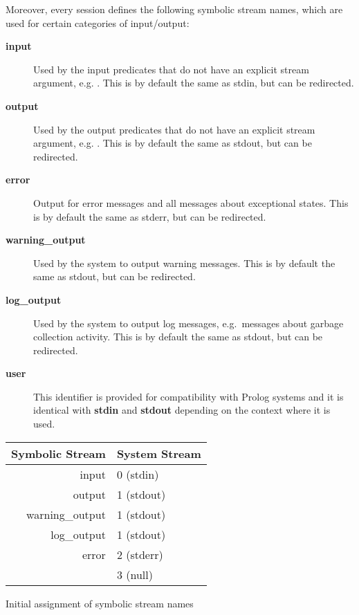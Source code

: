 Moreover, every {\eclipse} session defines the following symbolic stream
names, which are used for certain categories of input/output:
\begin{description}
\item[{\bf input}]	Used by the input predicates that do not have
an explicit stream argument, e.g. .
This is by default the same as stdin, but can be redirected.

\item[{\bf output}]	Used by the output predicates that do not have
an explicit stream argument, e.g. .
This is by default the same as stdout, but can be redirected.

\item[{\bf error}]
Output for error messages and all messages about exceptional states.
This is by default the same as stderr, but can be redirected.

\item[{\bf warning_output}]
Used by the system to output warning messages.
This is by default the same as stdout, but can be redirected.

\item[{\bf log_output}]
Used by the system to output log messages, e.g.\ messages about garbage
collection activity.
This is by default the same as stdout, but can be redirected.

\item[{\bf user}]
This identifier is provided for compatibility with Prolog
systems and it is identical with {\bf stdin} and {\bf stdout}
depending on the context where it is used.
\end{description}
\begin{center}
\begin{tabular}{|r|l|}
\hline
Symbolic Stream	&	System Stream	\\
\hline
\hline
input		&	0 (stdin)	\\
\hline
output		&	1 (stdout)	\\
warning_output	&	1 (stdout)	\\
log_output	&	1 (stdout)	\\
\hline
error		&	2 (stderr)	\\
\hline
		&	3 (null)	\\
\hline
\end{tabular}

Initial assignment of symbolic stream names
\end{center}

